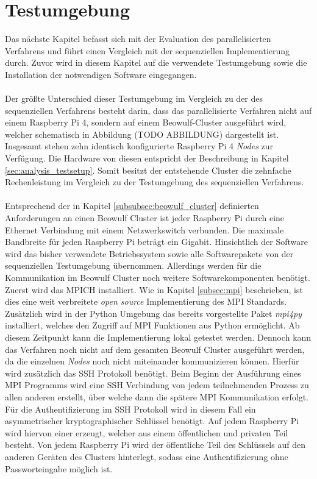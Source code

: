 \section{Testumgebung} %
Das nächste Kapitel befasst sich mit der Evaluation des parallelisierten Verfahrens und führt einen Vergleich mit der sequenziellen Implementierung durch. Zuvor wird in diesem Kapitel auf die verwendete Testumgebung sowie die Installation der notwendigen Software eingegangen. 
\\\\
Der größte Unterschied dieser Testumgebung im Vergleich zu der des sequenziellen Verfahrens besteht darin, dass das parallelisierte Verfahren nicht auf einem Raspberry Pi 4, sondern auf einem Beowulf-Cluster ausgeführt wird, welcher schematisch in Abbildung (TODO ABBILDUNG) dargestellt ist. Insgesamt stehen zehn identisch konfigurierte Raspberry Pi 4 \emph{Nodes} zur Verfügung. Die Hardware von diesen entspricht der Beschreibung in Kapitel \ref{sec:analysis_testsetup}. Somit besitzt der entstehende Cluster die zehnfache Rechenleistung im Vergleich zu der Testumgebung des sequenziellen Verfahrens.
\\\\
Entsprechend  der in Kapitel \ref{subsubsec:beowulf_cluster} definierten Anforderungen an einen Beowulf Cluster ist jeder Raspberry Pi durch eine Ethernet Verbindung mit einem Netzwerkswitch verbunden. Die maximale Bandbreite für jeden Raspberry Pi beträgt ein Gigabit. Hinsichtlich der Software wird das bisher verwendete Betriebssystem sowie alle Softwarepakete von der sequenziellen Testumgebung übernommen. Allerdings werden für die Kommunikation im Beowulf Cluster noch weitere Softwarekomponenten benötigt. Zuerst wird das MPICH installiert. Wie in Kapitel \ref{subsec:mpi} beschrieben, ist dies eine weit verbreitete \emph{open source} Implementierung des \ac{MPI} Standards. Zusätzlich wird in der Python Umgebung das bereits vorgestellte Paket \emph{mpi4py} installiert, welches den Zugriff auf \ac{MPI} Funktionen aus Python ermöglicht. Ab diesem Zeitpunkt kann die Implementierung lokal getestet werden. Dennoch kann das Verfahren noch nicht auf dem gesamten Beowulf Cluster ausgeführt werden, da die einzelnen \emph{Nodes} noch nicht miteinander kommunizieren können. Hierfür wird zusätzlich das \ac{SSH} Protokoll benötigt. Beim Beginn der Ausführung eines \ac{MPI} Programms wird eine \ac{SSH} Verbindung von jedem teilnehmenden Prozess zu allen anderen erstellt, über welche dann die spätere \ac{MPI} Kommunikation erfolgt. Für die Authentifizierung im \ac{SSH} Protokoll wird in diesem Fall ein asymmetrischer kryptographischer Schlüssel benötigt. Auf jedem Raspberry Pi wird hiervon einer erzeugt, welcher aus einem öffentlichen und privaten Teil besteht. Von jedem Raspberry Pi wird der öffentliche Teil des Schlüssels auf den anderen Geräten des Clusters hinterlegt, sodass eine Authentifizierung ohne Passworteingabe möglich ist.
